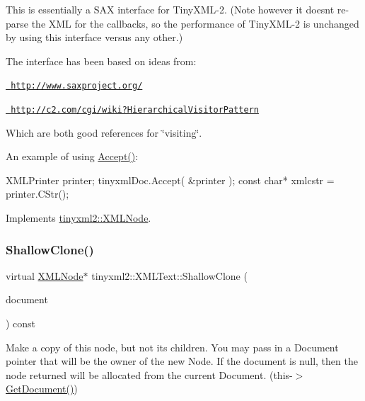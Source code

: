 This is essentially a S\+AX interface for Tiny\+X\+M\+L-\/2. (Note however it doesn\textquotesingle{}t re-\/parse the X\+ML for the callbacks, so the performance of Tiny\+X\+M\+L-\/2 is unchanged by using this interface versus any other.)

The interface has been based on ideas from\+:


\begin{DoxyItemize}
\item \href{http://www.saxproject.org/}{\texttt{ http\+://www.\+saxproject.\+org/}}
\item \href{http://c2.com/cgi/wiki?HierarchicalVisitorPattern}{\texttt{ http\+://c2.\+com/cgi/wiki?\+Hierarchical\+Visitor\+Pattern}}
\end{DoxyItemize}

Which are both good references for \char`\"{}visiting\char`\"{}.

An example of using \mbox{\hyperlink{classtinyxml2_1_1XMLText_a1b2c1448f1a21299d0a7913f18b55206}{Accept()}}\+: \begin{DoxyVerb}XMLPrinter printer;
tinyxmlDoc.Accept( &printer );
const char* xmlcstr = printer.CStr();
\end{DoxyVerb}
 

Implements \mbox{\hyperlink{classtinyxml2_1_1XMLNode_a81e66df0a44c67a7af17f3b77a152785}{tinyxml2\+::\+X\+M\+L\+Node}}.

\mbox{\label{classtinyxml2_1_1XMLText_af3a81ed4dd49d5151c477b3f265a3011}} 
\subsubsection{\texorpdfstring{ShallowClone()}{ShallowClone()}}
{\footnotesize\ttfamily virtual \mbox{\hyperlink{classtinyxml2_1_1XMLNode}{X\+M\+L\+Node}}$\ast$ tinyxml2\+::\+X\+M\+L\+Text\+::\+Shallow\+Clone (\begin{DoxyParamCaption}\item[{\mbox{\hyperlink{classtinyxml2_1_1XMLDocument}{X\+M\+L\+Document}} $\ast$}]{document }\end{DoxyParamCaption}) const\hspace{0.3cm}{\ttfamily [virtual]}}

Make a copy of this node, but not its children. You may pass in a Document pointer that will be the owner of the new Node. If the \textquotesingle{}document\textquotesingle{} is null, then the node returned will be allocated from the current Document. (this-\/$>$\mbox{\hyperlink{classtinyxml2_1_1XMLNode_af343d1ef0b45c0020e62d784d7e67a68}{Get\+Document()}})

